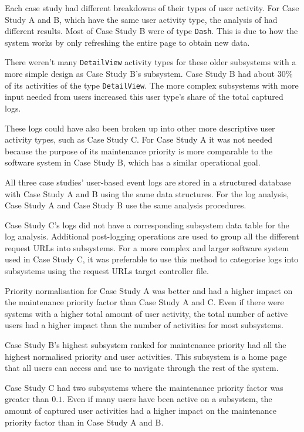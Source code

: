 Each case study had different breakdowns of their types of user activity. For Case Study A and B, which have the same user activity type, the analysis of  had different results. Most of Case Study B were of type \texttt{Dash}.  This is due to how the system works by only refreshing the entire page to obtain new data. \par There weren't many \texttt{DetailView} activity types for these older subsystems with a more simple design as Case Study B's subsystem. Case Study B had about $30\%$ of its activities of the type \texttt{DetailView}. The more complex subsystems with more input needed from users increased this user type's share of the total captured logs.\par These logs could have also been broken up into other more descriptive user activity types, such as Case Study C. For Case Study A it was not needed because the purpose of its maintenance priority is more comparable to the software system in Case Study B, which has a similar operational goal.\par All three case studies' user-based event logs are stored in a structured database with Case Study A and B using the same data structures. For the log analysis, Case Study A and Case Study B use the same analysis procedures. \par Case Study C's logs did not have a corresponding subsystem data table for the log analysis. Additional post-logging operations are used to group all the different request URLs into subsystems. For a more complex and larger software system used in Case Study C, it was preferable to use this method to categorise logs into subsystems using the request URLs target controller file.\par Priority normalisation for Case Study A was better and had a higher impact on the maintenance priority factor than Case Study A and C. Even if there were systems with a higher total amount of user activity, the total number of active users had a higher impact than the number of activities for most subsystems. \par Case Study B's highest subsystem ranked for maintenance priority had all the highest normalised priority and user activities. This subsystem is a home page that all users can access and use to navigate through the rest of the system. \par Case Study C had two subsystems where the maintenance priority factor was greater than $0.1$. Even if many users have been active on a subsystem, the amount of captured user activities had a higher impact on the maintenance priority factor than in Case Study A and B.

